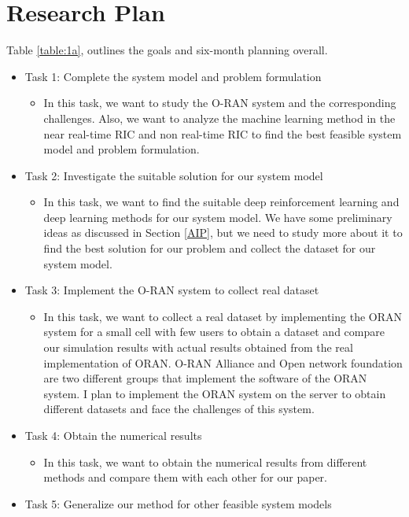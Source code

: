 \documentclass{article}
\begin{document}
\section{Research Plan}
Table \ref{table:1a}, outlines the goals and six-month planning overall.
\begin{itemize}
\item Task 1: Complete the system model and problem formulation
\begin{itemize}
\color{darkgray}
\item In this task, we want to study the O-RAN system and the corresponding challenges. Also, we want to analyze the machine learning method in the near real-time RIC and non real-time RIC to find the best feasible system model and problem formulation.
\end{itemize}
\item Task 2: Investigate the suitable solution for our system model
\begin{itemize}
\color{darkgray}
\item In this task, we want to find the suitable deep reinforcement learning and deep learning methods for our system model. We have some preliminary ideas as discussed in Section \ref{AIP}, but we need to study more about it to find the best solution for our problem and collect the dataset for our system model.
\end{itemize}
\item Task 3: Implement the O-RAN system to collect real dataset 
\begin{itemize}
\color{darkgray}
\item In this task, we want to collect a real dataset by implementing the ORAN system for a small cell with few users to obtain a dataset and compare our simulation results with actual results obtained from the real implementation of ORAN. O-RAN Alliance and Open network foundation are two different groups that implement the software of the ORAN system. I plan to implement the ORAN system on the server to obtain different datasets and face the challenges of this system. 
\end{itemize}
\item Task 4: Obtain the numerical results
\begin{itemize}
\color{darkgray}
\item In this task, we want to obtain the numerical results from different methods and compare them with each other for our paper.
\end{itemize}
\item Task 5: Generalize our method for other feasible system models

\end{itemize}
\end{document}
